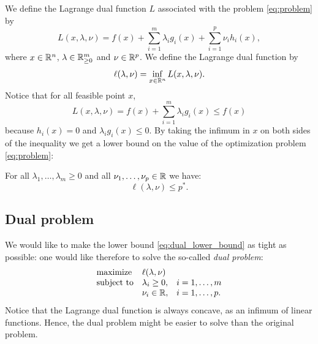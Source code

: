 \documentclass[11pt,nocut]{article}
\begin{document}
We define the Lagrange dual function $L$ associated with the problem \eqref{eq:problem} by
\begin{equation}
	L(x,\lambda,\nu) = 
	f(x) + \sum_{i=1}^m \lambda_i g_i(x) + \sum_{i=1}^p \nu_i h_i(x),
\end{equation}
where $x \in \mathbb{R}^n$, $\lambda \in \mathbb{R}_{\geq 0}^m$ and $\nu \in \mathbb{R}^p$. We define the Lagrange dual function by
$$
\ell(\lambda,\nu) = \inf_{x \in \mathbb{R}^n} L(x,\lambda,\nu).
$$
Notice that for all feasible point $x$,
$$
L(x,\lambda,\nu)
= f(x) + \sum_{i=1}^m \lambda_i g_i(x) \leq f(x)
$$
because $h_i(x) = 0$ and $\lambda_i g_i(x) \leq 0$. By taking the infimum in $x$ on both sides of the inequality we get a lower bound on the value of the optimization problem \eqref{eq:problem}:
\begin{proposition}
	For all $\lambda_1, \dots, \lambda_m \geq 0$ and all $\nu_1, \dots,\nu_p \in \mathbb{R}$ we have:
	\begin{equation}\label{eq:dual_lower_bound}
		\ell(\lambda,\nu) \leq p^*.
	\end{equation}
\end{proposition}

\subsection{Dual problem}

We would like to make the lower bound \eqref{eq:dual_lower_bound} as tight as possible: one would like therefore to solve the so-called \emph{dual problem}:
\begin{equation}\label{eq:dual_problem}
	\begin{array}{lll}
		\text{maximize} & \ell(\lambda,\nu) & \\
		\text{subject to} & \lambda_i \geq 0, & i=1, \dots, m \\
						  & \nu_i \in \mathbb{R}, & i=1, \dots, p.
	\end{array}
\end{equation}
Notice that the Lagrange dual function is always concave, as an infimum of linear functions. Hence, the dual problem might be easier to solve than the original problem.
\\
\end{document}
